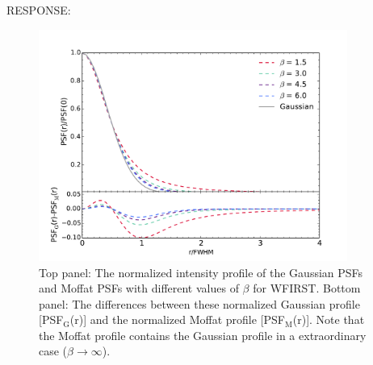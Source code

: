 \documentclass[a4paper,11pt]{article}
\begin{document}
RESPONSE:
\\
\begin{figure}
\begin{center}
\includegraphics[width=0.9\textwidth]{psf_gaussian_moffat_correct.pdf}
\end{center}
\caption{Top panel: The normalized intensity profile of the Gaussian PSFs and Moffat PSFs with different values of $\beta$ for WFIRST. Bottom panel: The differences between these normalized Gaussian profile [PSF$_{\mathrm{G}}$(r)] and the normalized Moffat profile [PSF$_{\mathrm{M}}$(r)]. Note that the Moffat profile contains the Gaussian profile in a extraordinary case ($\beta \rightarrow \infty$).}
\label{fig:psf_g_m}
\end{figure}
\end{document}
